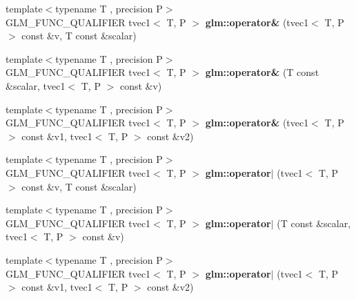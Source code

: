 \begin{DoxyCompactItemize}
\item 
\hypertarget{namespaceglm_a4d3153858b74de29d571c0987f37d430}{{\footnotesize template$<$typename T , precision P$>$ }\\G\-L\-M\-\_\-\-F\-U\-N\-C\-\_\-\-Q\-U\-A\-L\-I\-F\-I\-E\-R tvec1$<$ T, P $>$ {\bfseries glm\-::operator\&} (tvec1$<$ T, P $>$ const \&v, T const \&scalar)}\label{namespaceglm_a4d3153858b74de29d571c0987f37d430}

\item 
\hypertarget{namespaceglm_abcc8a4b866a2d7bc81869678a0fd88d7}{{\footnotesize template$<$typename T , precision P$>$ }\\G\-L\-M\-\_\-\-F\-U\-N\-C\-\_\-\-Q\-U\-A\-L\-I\-F\-I\-E\-R tvec1$<$ T, P $>$ {\bfseries glm\-::operator\&} (T const \&scalar, tvec1$<$ T, P $>$ const \&v)}\label{namespaceglm_abcc8a4b866a2d7bc81869678a0fd88d7}

\item 
\hypertarget{namespaceglm_a15a52cecc7869d6d1c4022296c818345}{{\footnotesize template$<$typename T , precision P$>$ }\\G\-L\-M\-\_\-\-F\-U\-N\-C\-\_\-\-Q\-U\-A\-L\-I\-F\-I\-E\-R tvec1$<$ T, P $>$ {\bfseries glm\-::operator\&} (tvec1$<$ T, P $>$ const \&v1, tvec1$<$ T, P $>$ const \&v2)}\label{namespaceglm_a15a52cecc7869d6d1c4022296c818345}

\item 
\hypertarget{namespaceglm_aab8263b0b5c67ca2a8b2d1d32afd5122}{{\footnotesize template$<$typename T , precision P$>$ }\\G\-L\-M\-\_\-\-F\-U\-N\-C\-\_\-\-Q\-U\-A\-L\-I\-F\-I\-E\-R tvec1$<$ T, P $>$ {\bfseries glm\-::operator$\vert$} (tvec1$<$ T, P $>$ const \&v, T const \&scalar)}\label{namespaceglm_aab8263b0b5c67ca2a8b2d1d32afd5122}

\item 
\hypertarget{namespaceglm_a15da8caf4a253c4254c46468c527a2cf}{{\footnotesize template$<$typename T , precision P$>$ }\\G\-L\-M\-\_\-\-F\-U\-N\-C\-\_\-\-Q\-U\-A\-L\-I\-F\-I\-E\-R tvec1$<$ T, P $>$ {\bfseries glm\-::operator$\vert$} (T const \&scalar, tvec1$<$ T, P $>$ const \&v)}\label{namespaceglm_a15da8caf4a253c4254c46468c527a2cf}

\item 
\hypertarget{namespaceglm_a4f13423d9e8ce29a4ff6569e689e442f}{{\footnotesize template$<$typename T , precision P$>$ }\\G\-L\-M\-\_\-\-F\-U\-N\-C\-\_\-\-Q\-U\-A\-L\-I\-F\-I\-E\-R tvec1$<$ T, P $>$ {\bfseries glm\-::operator$\vert$} (tvec1$<$ T, P $>$ const \&v1, tvec1$<$ T, P $>$ const \&v2)}\label{namespaceglm_a4f13423d9e8ce29a4ff6569e689e442f}


\end{DoxyCompactItemize}
